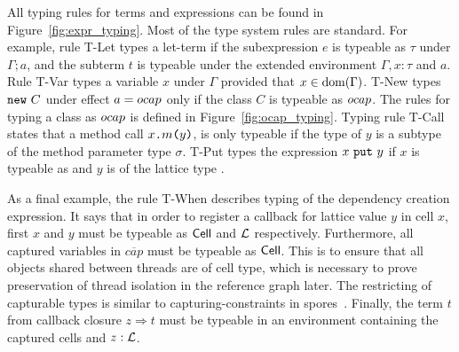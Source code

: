 All typing rules for terms and expressions can be found in
Figure~\ref{fig:expr_typing}. Most of the type system rules are standard. For
example, rule {\sc T-Let} types a let-term if the subexpression $e$ is typeable
as $\tau$ under $\Gamma; a$, and the subterm $t$ is typeable under the extended
environment $\Gamma, x: \tau$ and $a$. Rule {\sc T-Var} types a variable $x$ under
$\Gamma$ provided that $x \in \mbox{$\mathrm{dom}$}(\Gamma)$. {\sc T-New} types $\mbox{\mdseries\texttt{new}~$C$}$ under effect
$a = \mbox{$ocap$}$ only if the class $C$ is typeable as $\mbox{$ocap$}$. The rules for typing a
class as $\mbox{$ocap$}$ is defined in Figure~\ref{fig:ocap_typing}. Typing rule {\sc
T-Call} states that a method call $\mbox{\mdseries$x$\texttt{.}$m$\texttt{(}$y$\texttt{)}}$, is only typeable if the type
of $y$ is a subtype of the method parameter type $\sigma$. {\sc T-Put} types the
expression $\mbox{\mdseries$x$~\texttt{put}~$y$}$ if $x$ is typeable as \CellType{} and $y$ is of the lattice
type \LatType.

As a final example, the rule {\sc T-When} describes typing of the dependency
creation expression. It says that in order to register a callback for lattice
value $y$ in cell $x$, first $x$ and $y$ must be typeable as $\mbox{$\mathsf{Cell}$}$ and
$\mbox{$\mathcal{L}$}$ respectively. Furthermore, all captured variables in $\overline{cap}$
must be typeable as $\mbox{$\mathsf{Cell}$}$. This is to ensure that all objects shared
between threads are of cell type, which is necessary to prove preservation of
thread isolation in the reference graph later. The restricting of capturable
types is similar to capturing-constraints in
spores~\parencite{conf/ecoop/MillerHO14}.  Finally, the term $t$ from callback
closure $z \Rightarrow t$ must be typeable in an environment containing the
captured cells and $z: \mbox{$\mathcal{L}$}$.



